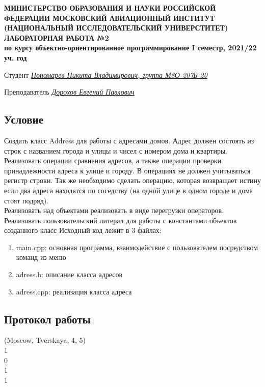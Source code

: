 \documentclass[12pt]{article}
\begin{document}
\begin{titlepage}
\begin{center}
\textbf{МИНИСТЕРСТВО ОБРАЗОВАНИЯ И НАУКИ РОССИЙСКОЙ ФЕДЕРАЦИИ
\medskip
МОСКОВСКИЙ АВИАЦИОННЫЙ ИНСТИТУТ
(НАЦИОНАЛЬНЫЙ ИССЛЕДОВАТЕЛЬСКИЙ УНИВЕРСТИТЕТ)
\vfill\vfill
{\Huge ЛАБОРАТОРНАЯ РАБОТА №2} \\
по курсу объектно-ориентированное программирование
I семестр, 2021/22 уч. год}
\end{center}
\vfill

Студент \uline{\it {Пономарев Никита Владимирович, группа М8О-207Б-20}\hfill}

Преподаватель \uline{\it {Дорохов Евгений Павлович}\hfill}

\vfill
\end{titlepage}

\subsection*{Условие}
Создать класс Address для работы с адресами домов. Адрес должен состоять из 
строк с названием города и улицы и чисел с номером дома и квартиры. Реализовать 
операции сравнения адресов, а также операции проверки принадлежности адреса к 
улице и городу. В операциях не должен учитываться регистр строки. Так же 
необходимо сделать операцию, которая возвращает истину если два адреса 
находятся по соседству (на одной улице в одном городе и дома стоят подряд). \\
Реализовать над объектами реализовать в виде перегрузки операторов.
Реализовать пользовательский литерал для работы с константами объектов
созданного класс
Исходный код лежит в 3 файлах:
\begin{enumerate}
\item main.cpp: основная программа, взаимодействие с пользователем посредством команд из меню
\item adress.h:    описание класса адресов
\item adress.cpp:  реализация класса адреса

\end{enumerate}
\pagebreak
\subsection*{Протокол работы}
(Moscow, Tverskaya, 4, 5) \\
1 \\
0 \\
1 \\
1 \\
\end{document}
